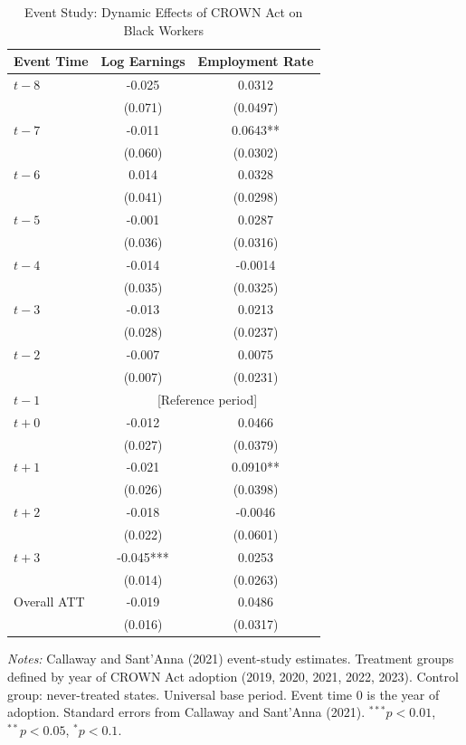 \begin{table}[htbp]
\centering
\caption{Event Study: Dynamic Effects of CROWN Act on Black Workers}
\label{tab:eventstudy}
\small
\begin{tabular}{lcc}
\toprule
Event Time & Log Earnings & Employment Rate \\
\midrule
$t  -8$ & -0.025 & 0.0312 \\
 & (0.071) & (0.0497) \\
$t  -7$ & -0.011 & 0.0643** \\
 & (0.060) & (0.0302) \\
$t  -6$ & 0.014 & 0.0328 \\
 & (0.041) & (0.0298) \\
$t  -5$ & -0.001 & 0.0287 \\
 & (0.036) & (0.0316) \\
$t  -4$ & -0.014 & -0.0014 \\
 & (0.035) & (0.0325) \\
$t  -3$ & -0.013 & 0.0213 \\
 & (0.028) & (0.0237) \\
$t  -2$ & -0.007 & 0.0075 \\
 & (0.007) & (0.0231) \\
$t  -1$ & \multicolumn{2}{c}{[Reference period]} \\
$t + 0$ & -0.012 & 0.0466 \\
 & (0.027) & (0.0379) \\
$t + 1$ & -0.021 & 0.0910** \\
 & (0.026) & (0.0398) \\
$t + 2$ & -0.018 & -0.0046 \\
 & (0.022) & (0.0601) \\
$t + 3$ & -0.045*** & 0.0253 \\
 & (0.014) & (0.0263) \\
\midrule
Overall ATT & -0.019 & 0.0486 \\
 & (0.016) & (0.0317) \\
\bottomrule
\end{tabular}
\begin{tablenotes}
\item \textit{Notes:} Callaway and Sant'Anna (2021) event-study estimates. Treatment groups defined by year of CROWN Act adoption (2019, 2020, 2021, 2022, 2023). Control group: never-treated states. Universal base period. Event time 0 is the year of adoption. Standard errors from Callaway and Sant'Anna (2021). $^{***}p<0.01$, $^{**}p<0.05$, $^{*}p<0.1$.
\end{tablenotes}
\end{table}
